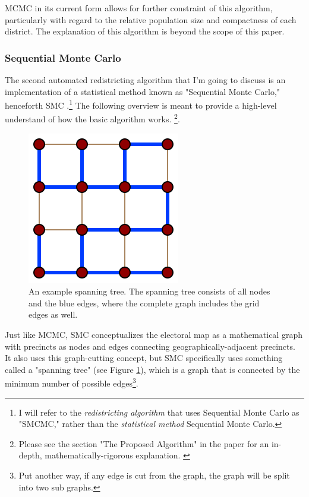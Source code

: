 MCMC in its current form allows for further constraint of this algorithm, particularly with regard to the relative population size and compactness of each district. \parencite[6]{fifield2020} The explanation of this algorithm is beyond the scope of this paper. 

\subsubsection{Sequential Monte Carlo}

The second automated redistricting algorithm that I'm going to discuss is an implementation of a statistical method known as "Sequential Monte Carlo," henceforth SMC \parencite{mccartan2020}.\footnote{I will refer to the \emph{redistricting algorithm} that uses Sequential Monte Carlo as "SMCMC," rather than the \emph{statistical method} Sequential Monte Carlo.} The following overview is meant to provide a high-level understand of how the basic algorithm works. \footnote{Please see the section "The Proposed Algorithm" in the paper for an in-depth, mathematically-rigorous explanation. \parencite[13]{mccartan2020}}.

\begin{figure}
    \includegraphics[width=0.3\linewidth]{img/4x4_grid_spanning_tree.png}
    \caption{An example spanning tree. The spanning tree consists of all nodes and the blue edges, where the complete graph includes the grid edges as well. \parencite{eppstein2007}}
    \label{fig:spantree}
\end{figure}

Just like MCMC, SMC conceptualizes the electoral map as a mathematical graph with precincts as nodes and edges connecting geographically-adjacent precincts. It also uses this graph-cutting concept, but SMC specifically uses something called a "spanning tree" (see Figure \ref{fig:spantree}), which is a graph that is connected by the minimum number of possible edges\footnote{Put another way, if any edge is cut from the graph, the graph will be split into two sub graphs.}. 

